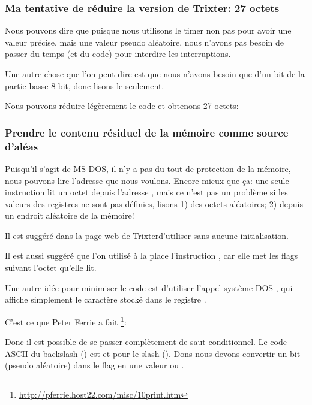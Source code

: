 \subsubsection{
Ma tentative de réduire la version de Trixter: 27 octets}

Nous pouvons dire que puisque nous utilisons le timer non pas pour avoir une valeur
précise, mais une valeur pseudo aléatoire, nous n'avons pas besoin de passer du temps
(et du code) pour interdire les interruptions.

Une autre chose que l'on peut dire est que nous n'avons besoin que d'un bit de la
partie basse 8-bit, donc lisons-le seulement.

Nous pouvons réduire légèrement le code et obtenons 27 octets:



\subsubsection{
Prendre le contenu résiduel de la mémoire comme source d'aléas}

Puisqu'il s'agit de MS-DOS, il n'y a pas du tout de protection de la mémoire, nous
pouvons lire l'adresse que nous voulons.
Encore mieux que ça: une seule instruction  lit un octet depuis l'adresse
, mais ce n'est pas un problème si les valeurs des registres ne sont pas
définies, lisons 1) des octets aléatoires; 2) depuis un endroit aléatoire de la mémoire! 

Il est suggéré dans la page web de Trixter\FNURLTRIXTER d'utiliser  sans
aucune initialisation.

Il est aussi suggéré que l'on utilisé à la place l'instruction , car elle
met les flags suivant l'octet qu'elle lit.

Une autre idée pour minimiser le code est d'utiliser l'appel système DOS ,
qui affiche simplement le caractère stocké dans le registre .

C'est ce que Peter Ferrie a fait
\footnote{\url{http://pferrie.host22.com/misc/10print.htm}}:



Donc il est possible de se passer complètement de saut conditionnel.
Le code \ac{ASCII} du backslash (\q{\textbackslash{}}) est  et 
pour le slash (\q{/}).
Dons nous devons convertir un bit (pseudo aléatoire) dans le flag  en une
valeur  ou .

